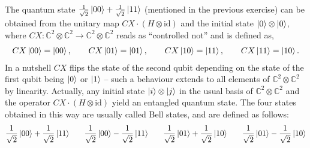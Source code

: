\documentclass[a4paper, 11pt]{article}
\newcommand{\complex}{\mathbb{C}}
\newcommand{\id}{\mathrm{id}}
\theoremstyle{definition}
\begin{document}
The quantum state
$\frac{1}{\sqrt{2}} \ket{00} + \frac{1}{\sqrt{2}} \ket{11}$ (mentioned
in the previous exercise) can be obtained from the unitary map
$CX \cdot (H \otimes \id)$ and the initial state
$\ket{0} \otimes \ket{0}$, where
$CX : \complex^2 \otimes \complex^2 \to \complex^2 \otimes \complex^2$
reads as ``controlled not'' and is defined as,
\begin{align*}
  CX \ket{00} = \ket{00},
  \hspace{0.7cm}
  CX \ket{01} = \ket{01},
  \hspace{0.7cm}
  CX \ket{10} = \ket{11},
  \hspace{0.7cm}
  CX \ket{11} = \ket{10}.
\end{align*}
In a nutshell $CX$ flips the state of the second qubit depending on
the state of the first qubit being $\ket{0}$ or $\ket{1}$ -- such a
behaviour extends to all elements of $\complex^2 \otimes \complex^2$
by linearity. Actually, any initial state $\ket{i} \otimes \ket{j}$ in
the usual basis of $\complex^2 \otimes \complex^2$ and the operator
$CX \cdot (H \otimes \id)$ yield an entangled quantum state. The four
states obtained in this way are usually called Bell states, and are
defined as follows:
\begin{align*}
  \frac{1}{\sqrt{2}} \ket{00} + \frac{1}{\sqrt{2}} \ket{11}
  \hspace{0.6cm}
  \frac{1}{\sqrt{2}} \ket{00} - \frac{1}{\sqrt{2}} \ket{11}
  \hspace{0.6cm}
  \frac{1}{\sqrt{2}} \ket{01} + \frac{1}{\sqrt{2}} \ket{10}
  \hspace{0.6cm}
  \frac{1}{\sqrt{2}} \ket{01} - \frac{1}{\sqrt{2}} \ket{10}
\end{align*}




\end{document}
